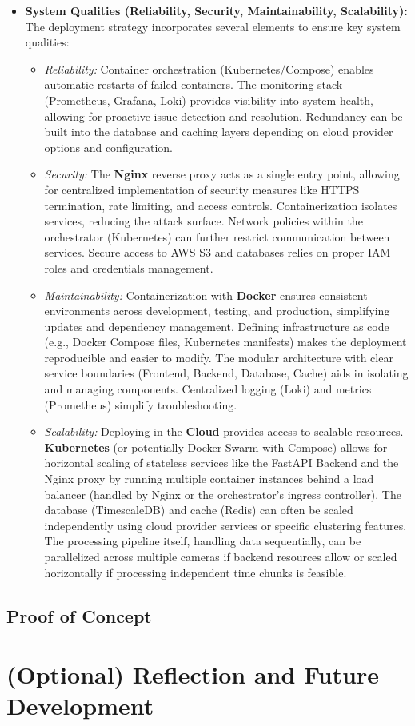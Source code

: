 \begin{itemize}
    \item \textbf{System Qualities (Reliability, Security, Maintainability, Scalability):}
        The deployment strategy incorporates several elements to ensure key system qualities:
        \begin{itemize}
            \item \textit{Reliability:} Container orchestration (Kubernetes/Compose) enables automatic restarts of failed containers. The monitoring stack (Prometheus, Grafana, Loki) provides visibility into system health, allowing for proactive issue detection and resolution. Redundancy can be built into the database and caching layers depending on cloud provider options and configuration.
            \item \textit{Security:} The \textbf{Nginx} reverse proxy acts as a single entry point, allowing for centralized implementation of security measures like HTTPS termination, rate limiting, and access controls. Containerization isolates services, reducing the attack surface. Network policies within the orchestrator (Kubernetes) can further restrict communication between services. Secure access to AWS S3 and databases relies on proper IAM roles and credentials management.
            \item \textit{Maintainability:} Containerization with \textbf{Docker} ensures consistent environments across development, testing, and production, simplifying updates and dependency management. Defining infrastructure as code (e.g., Docker Compose files, Kubernetes manifests) makes the deployment reproducible and easier to modify. The modular architecture with clear service boundaries (Frontend, Backend, Database, Cache) aids in isolating and managing components. Centralized logging (Loki) and metrics (Prometheus) simplify troubleshooting.
            \item \textit{Scalability:} Deploying in the \textbf{Cloud} provides access to scalable resources. \textbf{Kubernetes} (or potentially Docker Swarm with Compose) allows for horizontal scaling of stateless services like the FastAPI Backend and the Nginx proxy by running multiple container instances behind a load balancer (handled by Nginx or the orchestrator's ingress controller). The database (TimescaleDB) and cache (Redis) can often be scaled independently using cloud provider services or specific clustering features. The processing pipeline itself, handling data sequentially, can be parallelized across multiple cameras if backend resources allow or scaled horizontally if processing independent time chunks is feasible.
        \end{itemize}
\end{itemize}

\subsection{Proof of Concept}
\label{subsection:poc} %

\section{(Optional) Reflection and Future Development}
\label{section:reflection} %
